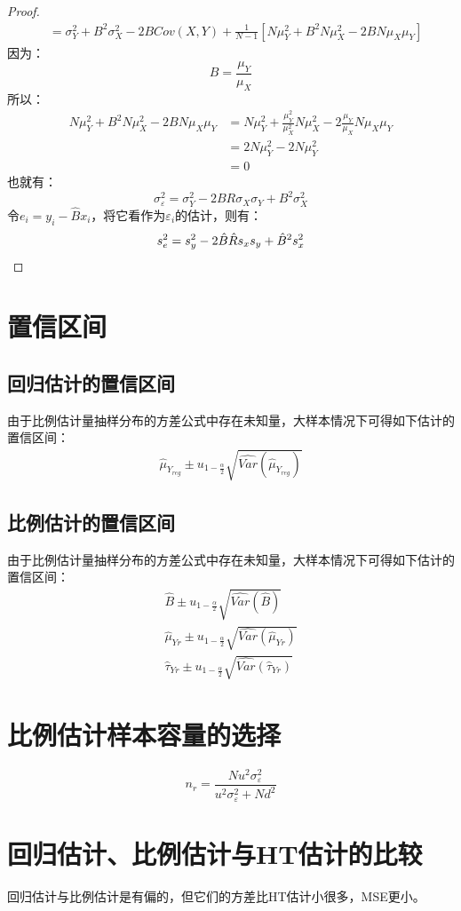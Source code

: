 \begin{proof}
\begin{align*}
		&=\sigma_Y^2+B^2\sigma_X^2-2BCov(X,Y)+\frac{1}{N-1}\left[N\mu_Y^2+B^2N\mu_X^2-2BN\mu_X\mu_Y\right]
	\end{align*}
	因为：
	\begin{equation*}
		B=\frac{\mu_Y}{\mu_X}
	\end{equation*}
	所以：
	\begin{align*}
		N\mu_Y^2+B^2N\mu_X^2-2BN\mu_X\mu_Y
		&=N\mu_Y^2+\frac{\mu_Y^2}{\mu_X^2}N\mu_X^2-2\frac{\mu_Y}{\mu_X}N\mu_X\mu_Y \\
		&=2N\mu_Y^2-2N\mu_Y^2 \\
		&=0
	\end{align*}
	也就有：
	\begin{equation*}
		\sigma_\varepsilon^2=\sigma_Y^2-2BR\sigma_X\sigma_Y+B^2\sigma_X^2
	\end{equation*}
	令$e_i=y_i-\hat{B}x_i$，将它看作为$\varepsilon_i$的估计，则有：
	\begin{equation*}
		s_e^2 =s_y^2-2\hat{B}\hat{R}s_xs_y+\hat{B}^2s_x^2\qedhere
	\end{equation*}
\end{proof}

\section{置信区间}

\subsection{回归估计的置信区间}
由于比例估计量抽样分布的方差公式中存在未知量，大样本情况下可得如下估计的置信区间：
\begin{gather*}
	\hat{\mu}_{Y_{reg}}\pm u_{1-\frac{\alpha}{2}}\sqrt{\widehat{Var}(\hat{\mu}_{Y_{reg}})}
\end{gather*}

\subsection{比例估计的置信区间}
由于比例估计量抽样分布的方差公式中存在未知量，大样本情况下可得如下估计的置信区间：
\begin{gather*}
	\hat{B}\pm u_{1-\frac{\alpha}{2}}\sqrt{\widehat{Var}(\hat{B})} \\
	\hat{\mu}_{Yr}\pm u_{1-\frac{\alpha}{2}}\sqrt{\widehat{Var}(\hat{\mu}_{Yr})} \\
	\hat{\tau}_{Yr}\pm u_{1-\frac{\alpha}{2}}\sqrt{\widehat{Var}(\hat{\tau}_{Yr})}
\end{gather*}
\section{比例估计样本容量的选择}
\begin{equation*}
	n_r=\frac{Nu^2\sigma_\varepsilon^2}{u^2\sigma_\varepsilon^2+Nd^2}
\end{equation*}
\section{回归估计、比例估计与HT估计的比较}
回归估计与比例估计是有偏的，但它们的方差比HT估计小很多，MSE更小。



